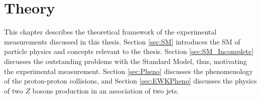 \part{\LARGE{Theory}}
\label{sec:theory}

This chapter describes the theoretical framework of the experimental measurements discussed in this thesis. Section  \ref{sec:SM} introduces the SM of particle physics and concepts relevant to the thesis. Section \ref{sec:SM_Incomplete} discusses the outstanding problems with the Standard Model, thus, motivating the experimental measurement. Section \ref{sec:Pheno} discusses the phenomenology of the proton-proton collisions, and Section \ref{sec:EWKPheno} discusses the physics of two $Z$ bosons production in an association of two jets. 
